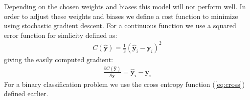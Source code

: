 \documentclass[11pt]{article}
\begin{document}
Depending on the chosen weights and biases this model will not perform well. In order to adjust these weights and biases we define a cost function to minimize using stochastic gradient descent. For a continuous function we use a squared error function for simlicity defined as:
\begin{align*}
    C(\hat{\boldsymbol{y}}) = \frac{1}{2}(\hat{\boldsymbol{y}}_i - \boldsymbol{y}_i)^2
\end{align*}
giving the easily computed gradient:
\begin{align*}
    \frac{\partial C(\hat{\boldsymbol{y}})}{\partial  \hat{\boldsymbol{y}}} = \hat{\boldsymbol{y}}_i - \boldsymbol{y}_i
\end{align*}
For a binary classification problem we use the cross entropy function (\ref{eq:cross}) defined earlier.
\end{document}
